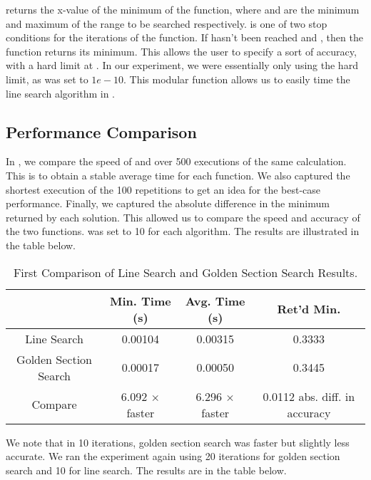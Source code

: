 	\begin{center}
	\end{center}
	
	 returns the x-value of the minimum of the function, where  and  are the minimum and maximum of the range to be searched respectively.  is one of two stop conditions for the iterations of the function. If  hasn't been reached and , then the function returns its minimum. This allows the user to specify a sort of accuracy, with a hard limit at . In our experiment, we were essentially only using the hard limit, as  was set to $1e-10$. This modular function allows us to easily time the line search algorithm in .
	
	
\subsection{Performance Comparison}
	In , we compare the speed of  and  over 500 executions of the same calculation. This is to obtain a stable average time for each function. We also captured the shortest execution of the 100 repetitions to get an idea for the best-case performance. Finally, we captured the absolute difference in the minimum returned by each solution. This allowed us to compare the speed and accuracy of the two functions.  was set to 10 for each algorithm. The results are illustrated in the table below.
	
	\begin{table}[H]
	\centering\makegapedcells
	\begin{tabular}{|| c | c c c ||}
	\cline{2-4}
   \multicolumn{1}{c|}{} & Min. Time (s) & Avg. Time (s) & Ret'd Min. \\
	\hline
	Line Search & 0.00104 & 0.00315 & 0.3333 \\
	Golden Section Search & 0.00017 & 0.00050 & 0.3445 \\
	Compare & 6.092 $\times$ faster & 6.296 $\times$ faster & 0.0112 abs. diff. in accuracy \\ 
	\hline
	\end{tabular}
	\caption{First Comparison of Line Search and Golden Section Search Results.}
	\end{table}
	
	We note that in 10 iterations, golden section search was faster but slightly less accurate. We ran the experiment again using 20 iterations for golden section search and 10 for line search. The results are in the table below.
	
